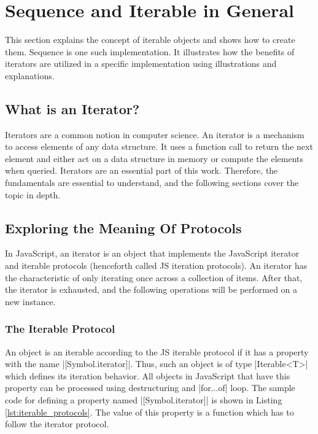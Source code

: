 \section{Sequence and Iterable in General}
\label{sec:Sequence and Iterable in General}
This section explains the concept of iterable objects and shows how to create 
them. Sequence is one such implementation. It illustrates how the benefits of 
iterators are utilized in a specific implementation using illustrations and 
explanations.

\subsection{What is an Iterator?}
\label{sub:What is an Iterator?}
Iterators are a common notion in computer science. An iterator is a mechanism 
to access elements of any data structure. It uses a function call to return the 
next element and either act on a data structure in memory or compute the 
elements when queried. Iterators are an essential part of this work. Therefore, 
the fundamentals are essential to understand, and the following sections cover
the topic in depth.

\subsection{Exploring the Meaning Of Protocols}
\label{sub:Exploring the Meaning Of Protocols}
In JavaScript, an iterator is an object that implements the JavaScript iterator
and iterable protocols \cite{mdn_protocols}
(henceforth called JS iteration protocols). An iterator
has the characteristic of only iterating once across a collection of items.
After that, the iterator is exhausted, and the following operations will be
performed on a new instance.

\subsubsection{The Iterable Protocol}
\label{subsub:The Iterable Protocol}
An object is an iterable according to the JS iterable protocol if it has a
property with the name |[Symbol.iterator]|. Thus, such an object is of type
|Iterable<T>| which defines its iteration behavior.
All objects in JavaScript that have this property can be processed using 
destructuring and |for...of| loop. 
The sample code for defining a property named |[Symbol.iterator]| is shown
in Listing \ref{lst:iterable_protocols}. The value of this property is a
function which has to follow the iterator protocol.

